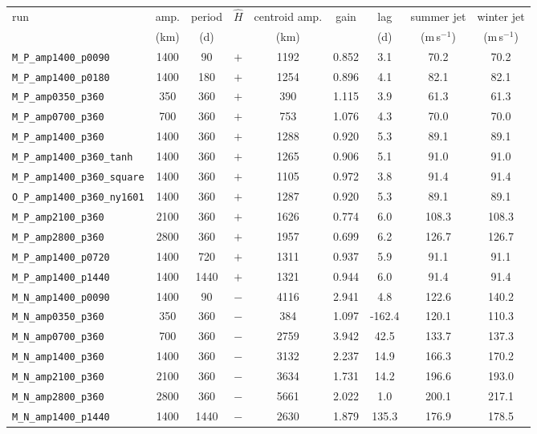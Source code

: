 {\footnotesize
\begin{tabular}{lcccccccc}
\toprule
run & amp. & period & $\hat H$ & centroid amp. & gain & lag & summer jet & winter jet\\
 & (km) & (d) & & (km) & & (d) & (m\,s$^{-1}$) & (m\,s$^{-1}$)\\
\midrule
\texttt{M\_P\_amp1400\_p0090} & 1400 & 90 & $+$ & 1192 & 0.852 & 3.1 & 70.2 & 70.2\\
\texttt{M\_P\_amp1400\_p0180} & 1400 & 180 & $+$ & 1254 & 0.896 & 4.1 & 82.1 & 82.1\\
\texttt{M\_P\_amp0350\_p360} & 350 & 360 & $+$ & 390 & 1.115 & 3.9 & 61.3 & 61.3\\
\texttt{M\_P\_amp0700\_p360} & 700 & 360 & $+$ & 753 & 1.076 & 4.3 & 70.0 & 70.0\\
\texttt{M\_P\_amp1400\_p360} & 1400 & 360 & $+$ & 1288 & 0.920 & 5.3 & 89.1 & 89.1\\
\texttt{M\_P\_amp1400\_p360\_tanh} & 1400 & 360 & $+$ & 1265 & 0.906 & 5.1 & 91.0 & 91.0\\
\texttt{M\_P\_amp1400\_p360\_square} & 1400 & 360 & $+$ & 1105 & 0.972 & 3.8 & 91.4 & 91.4\\
\texttt{O\_P\_amp1400\_p360\_ny1601} & 1400 & 360 & $+$ & 1287 & 0.920 & 5.3 & 89.1 & 89.1\\
\texttt{M\_P\_amp2100\_p360} & 2100 & 360 & $+$ & 1626 & 0.774 & 6.0 & 108.3 & 108.3\\
\texttt{M\_P\_amp2800\_p360} & 2800 & 360 & $+$ & 1957 & 0.699 & 6.2 & 126.7 & 126.7\\
\texttt{M\_P\_amp1400\_p0720} & 1400 & 720 & $+$ & 1311 & 0.937 & 5.9 & 91.1 & 91.1\\
\texttt{M\_P\_amp1400\_p1440} & 1400 & 1440 & $+$ & 1321 & 0.944 & 6.0 & 91.4 & 91.4\\
\texttt{M\_N\_amp1400\_p0090} & 1400 & 90 & $-$ & 4116 & 2.941 & 4.8 & 122.6 & 140.2\\
\texttt{M\_N\_amp0350\_p360} & 350 & 360 & $-$ & 384 & 1.097 & -162.4 & 120.1 & 110.3\\
\texttt{M\_N\_amp0700\_p360} & 700 & 360 & $-$ & 2759 & 3.942 & 42.5 & 133.7 & 137.3\\
\texttt{M\_N\_amp1400\_p360} & 1400 & 360 & $-$ & 3132 & 2.237 & 14.9 & 166.3 & 170.2\\
\texttt{M\_N\_amp2100\_p360} & 2100 & 360 & $-$ & 3634 & 1.731 & 14.2 & 196.6 & 193.0\\
\texttt{M\_N\_amp2800\_p360} & 2800 & 360 & $-$ & 5661 & 2.022 & 1.0 & 200.1 & 217.1\\
\texttt{M\_N\_amp1400\_p1440} & 1400 & 1440 & $-$ & 2630 & 1.879 & 135.3 & 176.9 & 178.5\\
\bottomrule
\end{tabular}
}
